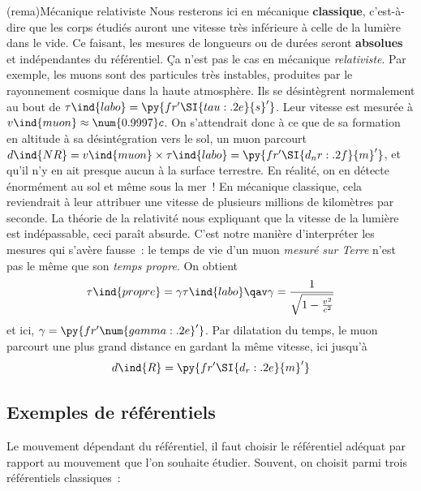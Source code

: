 \documentclass[../../main/main.tex]{subfiles}
\begin{document}
\begin{tcb*}(rema){Mécanique relativiste}
	Nous resterons ici en mécanique \textbf{classique}, c'est-à-dire que les
	corps étudiés auront une vitesse très inférieure à celle de la lumière dans
	le vide. Ce faisant, les mesures de longueurs ou de durées seront
	\textbf{absolues} et indépendantes du référentiel. Ça n'est pas le cas en
	mécanique \textit{relativiste}.
	\bigbreak
	Par exemple, les muons sont des particules très instables, produites par le
	rayonnement cosmique dans la haute atmosphère. Ils se désintègrent normalement
	au bout de $\tau\ind{labo} = \py{fr'\SI{{{tau:.2e}}}{{s}}'}$. Leur vitesse est
	mesurée à $v\ind{muon} \approx \num{0.9997}c$.
	\smallbreak
	On s'attendrait donc à ce que de sa formation en altitude à sa désintégration
	vers le sol, un muon parcourt $d\ind{NR} = v\ind{muon} \times \tau\ind{labo} =
		\py{fr'\SI{{{d_nr:.2f}}}{{m}}'}$, et qu'il n'y en ait presque aucun à la
	surface terrestre.
	\smallbreak
	En réalité, on en détecte énormément au sol et même sous la mer~! En mécanique
	classique, cela reviendrait à leur attribuer une vitesse de plusieurs millions
	de kilomètres par seconde. La théorie de la relativité nous expliquant que la
	vitesse de la lumière est indépassable, ceci paraît absurde. C'est notre
	manière d'interpréter les mesures qui s'avère fausse~: le temps de vie d'un
	muon \textit{mesuré sur Terre} n'est pas le même que son \textit{temps
		propre}. On obtient
	\[
		\tau\ind{propre} = \gamma\tau\ind{labo}
		\qav
		\gamma = \frac{1}{\sqrt{1-\frac{v^{2}}{c^{2}}}}
	\]
	et ici, $\gamma = \py{fr'\num{{{gamma:.2e}}}'}$. Par dilatation du temps, le
	muon parcourt une plus grand distance en gardant la même vitesse, ici jusqu'à
	\[
		d\ind{R} = \py{fr'\SI{{{d_r:.2e}}}{{m}}'}
	\]
\end{tcb*}
\subsection{Exemples de référentiels}

Le mouvement dépendant du référentiel, il faut choisir le référentiel adéquat
par rapport au mouvement que l'on souhaite étudier. Souvent, on choisit parmi
trois référentiels classiques~:
\end{document}
